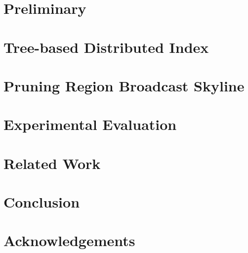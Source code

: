 \documentclass{sig-alternate}
\begin{document}
\section{Preliminary}\label{sec-prelim}


\section{Tree-based Distributed Index}\label{sec-index}


\section{Pruning Region Broadcast Skyline}\label{sec-pruning}


\section{Experimental Evaluation}\label{sec-exp}


\section{Related Work}\label{sec-related}


\section{Conclusion}\label{sec-conc}


\section*{Acknowledgements}






\end{document}
